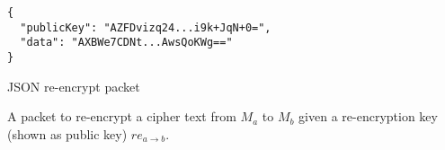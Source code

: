 \begin{listing}[H]
  \centering
  \begin{verbatim}
{
  "publicKey": "AZFDvizq24...i9k+JqN+0=",
  "data": "AXBWe7CDNt...AwsQoKWg=="
}
  \end{verbatim}
  \caption{
  	JSON re-encrypt packet
  }{
  	A packet to re-encrypt a cipher text from $M_a$ to $M_b$ given a re-encryption key (shown as public key) $re_{a \rightarrow b}$.
  }
  \label{code:reencrypt_data_json}
\end{listing}
